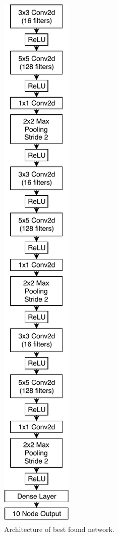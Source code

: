 \documentclass[conference]{IEEEtran}
\begin{document}
\begin{figure}
  \centering
  \includegraphics[height=.95\textheight]{img/best-model}
  \caption{Architecture of best found network.}
  \label{fig:best}
\end{figure}
\end{document}
